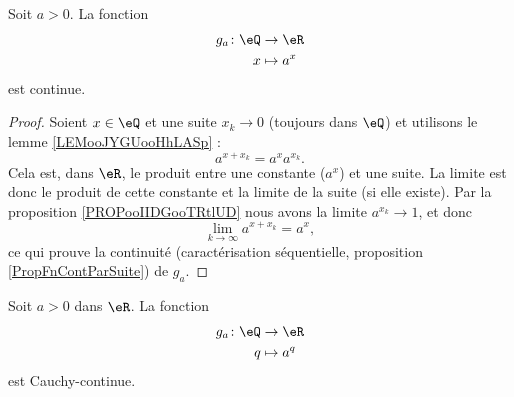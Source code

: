 \begin{lemma}       \label{LEMooKDBPooLQwxMD}
	Soit \( a>0\). La fonction
	\begin{equation}
		\begin{aligned}
			g_a\colon \eQ & \to \eR     \\
			x             & \mapsto a^x
		\end{aligned}
	\end{equation}
	est continue.
\end{lemma}

\begin{proof}
	Soient \( x\in \eQ\) et une suite \( x_k\to 0\) (toujours dans \( \eQ\)) et utilisons le lemme \ref{LEMooJYGUooHhLASp} :
	\begin{equation}
		a^{x+x_k}=a^xa^{x_k}.
	\end{equation}
	Cela est, dans \( \eR\), le produit entre une constante (\( a^x\)) et une suite. La limite est donc le produit de cette constante et la limite de la suite (si elle existe). Par la proposition \ref{PROPooIIDGooTRtlUD} nous avons la limite \( a^{x_k}\to 1\), et donc
	\begin{equation}
		\lim_{k\to \infty} a^{x+x_k}=a^x,
	\end{equation}
	ce qui prouve la continuité (caractérisation séquentielle, proposition \ref{PropFnContParSuite}) de \( g_a\).
\end{proof}

\begin{proposition}     \label{PROPooQRFSooVzYdJM}
	Soit \( a>0\) dans \( \eR\). La fonction
	\begin{equation}
		\begin{aligned}
			g_a\colon \eQ & \to \eR     \\
			q             & \mapsto a^q
		\end{aligned}
	\end{equation}
	est Cauchy-continue.
\end{proposition}

